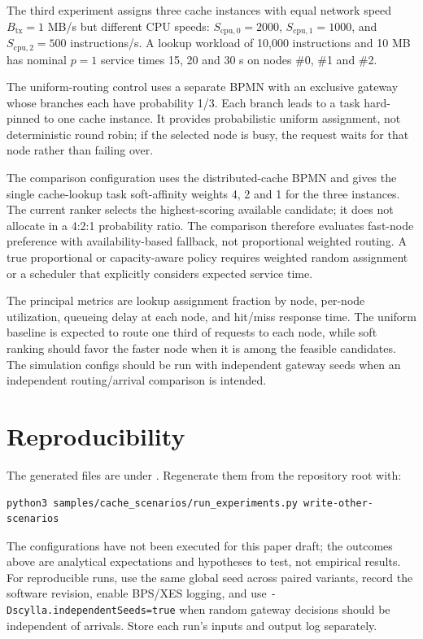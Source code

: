 \documentclass[conference]{IEEEtran}
\begin{document}
The third experiment assigns three cache instances with equal network speed $B_{\mathrm{tx}}=1$ MB/s but different
CPU speeds: $S_{\mathrm{cpu},0}=2000$, $S_{\mathrm{cpu},1}=1000$, and $S_{\mathrm{cpu},2}=500$ instructions/s. A
lookup workload of 10,000 instructions and 10 MB has nominal $p=1$ service times 15, 20 and 30 s on nodes \#0, \#1
and \#2.

The uniform-routing control uses a separate BPMN with an exclusive gateway whose branches each have probability 1/3.
Each branch leads to a task hard-pinned to one cache instance. It provides probabilistic uniform assignment, not
deterministic round robin; if the selected node is busy, the request waits for that node rather than failing over.

The comparison configuration uses the distributed-cache BPMN and gives the single cache-lookup task soft-affinity
weights 4, 2 and 1 for the three instances. The current ranker selects the highest-scoring available candidate; it
does not allocate in a 4:2:1 probability ratio. The comparison therefore evaluates fast-node preference with
availability-based fallback, not proportional weighted routing. A true proportional or capacity-aware policy
requires weighted random assignment or a scheduler that explicitly considers expected service time.

The principal metrics are lookup assignment fraction by node, per-node utilization, queueing delay at each node, and
hit/miss response time. The uniform baseline is expected to route one third of requests to each node, while soft
ranking should favor the faster node when it is among the feasible candidates. The simulation configs should be run
with independent gateway seeds when an independent routing/arrival comparison is intended.

\section{Reproducibility}

The generated files are under . Regenerate them from the repository root with:
\begin{verbatim}
python3 samples/cache_scenarios/run_experiments.py write-other-scenarios
\end{verbatim}
The configurations have not been executed for this paper draft; the outcomes above are analytical expectations and
hypotheses to test, not empirical results. For reproducible runs, use the same global seed across paired variants,
record the software revision, enable BPS/XES logging, and use
\texttt{-Dscylla.independentSeeds=true} when random gateway decisions should be independent of arrivals. Store each
run's inputs and output log separately.
\end{document}
